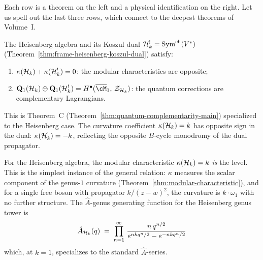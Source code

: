 Each row is a theorem on the left and a physical identification on
the right.  Let us spell out the last three rows, which connect to
the deepest theorems of Volume~I.

\begin{proposition}
\label{prop:rosetta-complementarity}
The Heisenberg algebra and its Koszul dual
$\mathcal{H}_k^! = \mathrm{Sym}^{\mathrm{ch}}(V^*)$
\textup{(}Theorem~\ref{thm:frame-heisenberg-koszul-dual}\textup{)}
satisfy:
\begin{enumerate}[label=\textup{(\roman*)}]
\item $\kappa(\mathcal{H}_k) + \kappa(\mathcal{H}_k^!) = 0$:
  the modular characteristics are opposite;
\item $\mathbf{Q}_1(\cH_k) \oplus \mathbf{Q}_1(\cH_k^!)
  = H^{\bullet}(\overline{\cM}_1,\, \mathcal{Z}_{\cH_k})$:
  the quantum corrections are complementary Lagrangians.
\end{enumerate}
This is Theorem~C
\textup{(Theorem~\ref{thm:quantum-complementarity-main})}
specialized to the Heisenberg case.  The curvature coefficient
$\kappa(\mathcal{H}_k) = k$ has opposite sign in the dual:
$\kappa(\mathcal{H}_k^!) = -k$, reflecting the opposite $B$-cycle
monodromy of the dual propagator.
\end{proposition}

\begin{remark}
\label{rem:rosetta-kappa-is-k}
For the Heisenberg algebra, the modular characteristic
$\kappa(\mathcal{H}_k) = k$ \emph{is} the level.  This is the simplest
instance of the general relation: $\kappa$ measures the scalar
component of the genus-$1$ curvature
(Theorem~\ref{thm:modular-characteristic}), and for a single
free boson with propagator $k/(z - w)^2$, the curvature is
$k \cdot \omega_1$ with no further structure.  The $\hat{A}$-genus
generating function for the Heisenberg genus tower is
\begin{equation}\label{eq:rosetta-ahat}
\hat{A}_{\mathcal{H}_k}(q)
\;=\;
\prod_{n=1}^{\infty}\,
\frac{n\, q^{n/2}}{e^{n k q^n / 2} - e^{-n k q^n / 2}}
\end{equation}
which, at $k = 1$, specializes to the standard $\hat{A}$-series.
\end{remark}

